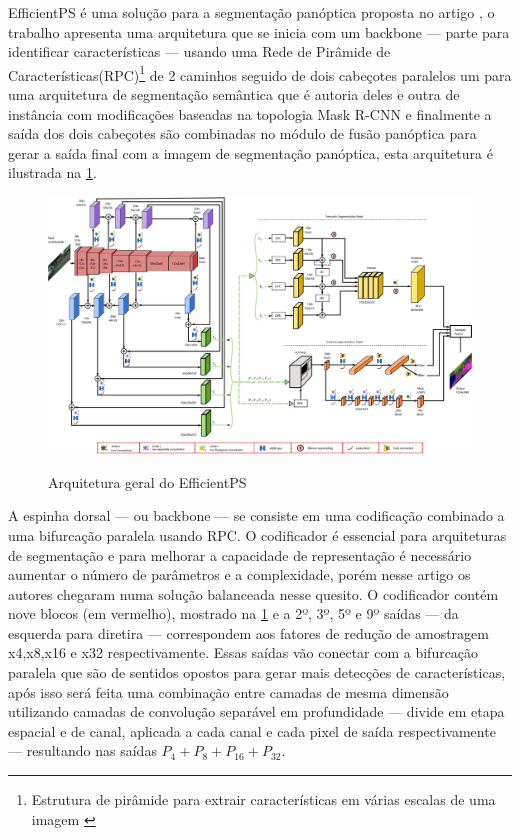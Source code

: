 
EfficientPS é uma solução para a segmentação panóptica proposta no artigo \space{}, o trabalho apresenta uma arquitetura que se inicia com um backbone — parte para identificar características — usando uma Rede de Pirâmide de Características(RPC)\footnote{Estrutura de pirâmide para extrair características em várias escalas de uma imagem \space\cite{piramide}} de 2 caminhos seguido de dois cabeçotes paralelos um para uma arquitetura de segmentação semântica que é autoria deles e outra de instância com modificações baseadas na topologia Mask R-CNN e finalmente a saída dos dois cabeçotes são combinadas no módulo de fusão panóptica para gerar a saída final com a imagem de segmentação panóptica, esta arquitetura é ilustrada na \cref{fig:arqEP}.

\begin{figure}[ht]
	\caption{Arquitetura geral do EfficientPS}
	\centering %
	\includegraphics[width=15cm]{figures/arqEP.jpg} %
	\label{fig:arqEP}
\end{figure}


A espinha dorsal — ou backbone — se consiste em uma codificação combinado a uma bifurcação paralela usando RPC. O codificador é essencial para arquiteturas de segmentação e para melhorar a capacidade de representação é necessário aumentar o número de parâmetros e a complexidade, porém nesse artigo os autores chegaram numa solução balanceada nesse quesito. O codificador contém nove blocos (em vermelho), mostrado na \cref{fig:arqEP} e a 2º, 3º, 5º e 9º saídas — da esquerda para diretira — correspondem aos fatores de redução de amostragem x4,x8,x16 e x32 respectivamente. Essas saídas vão conectar com a bifurcação paralela que são de sentidos opostos para gerar mais detecções de características, após isso será feita uma combinação entre camadas de mesma dimensão utilizando camadas de convolução separável em profundidade — divide em etapa espacial e de canal, aplicada a cada canal e cada pixel de saída respectivamente — resultando nas saídas $ P_4 + P_8 + P_{16} + P_{32} $\cite{mohan2020efficientps, redes-neurais-convolucionais-separaveis-em-profundidade}.

